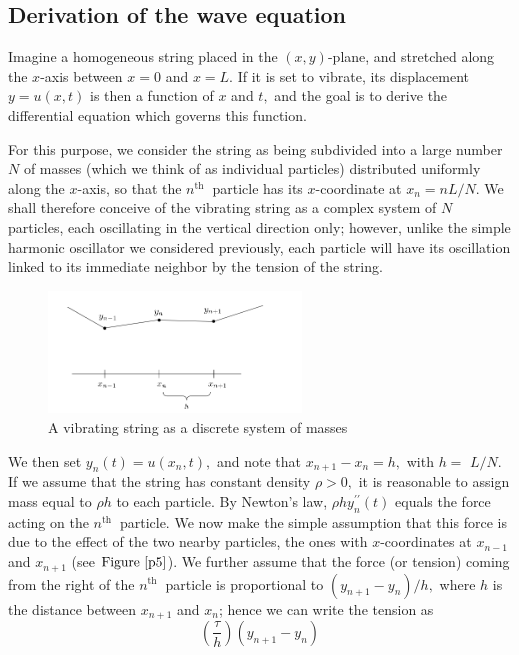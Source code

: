 \documentclass[12pt]{book}
\theoremstyle{definition}\newtheorem{dfn}{Définition}[chapter]
\theoremstyle{plain}\newtheorem{thm}{Théorème}[chapter]
\theoremstyle{plain}\newtheorem{prp}{Proposition}[chapter]
\theoremstyle{plain}\newtheorem{lem}{\bf Lemme}[chapter]
\theoremstyle{plain}\newtheorem{axm}{\bf Axiome}[chapter]
\theoremstyle{plain}\newtheorem{lmm}{\bf Lemme}[chapter]
\theoremstyle{plain}\newtheorem{exm}{\bf Example}[chapter]
\theoremstyle{plain}\newtheorem{cor}{\bf Corollaire}[chapter]
\theoremstyle{remark}\newtheorem{rem}{Remarque}[chapter]
\newcommand{\reffig}[1]{\text{Figure}\ \ref{#1}}
\begin{document}
\subsection{ Derivation of the wave equation}
Imagine a homogeneous string placed in the $(x, y)$-plane, and stretched along the $x$-axis between $x=0$ and $x=L .$ If it is set to vibrate, its displacement $y=u(x, t)$ is then a function of $x$ and $t,$ and the goal is to derive the differential equation which governs this function.

For this purpose, we consider the string as being subdivided into a large number $N$ of masses (which we think of as individual particles) distributed uniformly along the $x$-axis, so that the $n^{\text {th }}$ particle has its $x$-coordinate at $x_{n}=n L / N .$ We shall therefore conceive of the vibrating string as a complex system of $N$ particles, each oscillating in the vertical direction only; however, unlike the simple harmonic oscillator we considered previously, each particle will have its oscillation linked to its immediate neighbor by the tension of the string.
\begin{figure}[H]\centering\includegraphics[width=0.6\textwidth]{image//The Genesis of Fourier Analysis//5}
	\caption{A vibrating string as a discrete system of masses}
	\label{p5}	
\end{figure}
We then set $y_{n}(t)=u\left(x_{n}, t\right),$ and note that $x_{n+1}-x_{n}=h,$ with $h=$ $L / N .$ If we assume that the string has constant density $\rho>0,$ it is reasonable to assign mass equal to $\rho h$ to each particle. By Newton's law, $\rho h y_{n}^{\prime \prime}(t)$ equals the force acting on the $n^{\text {th }}$ particle. We now make the simple assumption that this force is due to the effect of the two nearby particles, the ones with $x$-coordinates at $x_{n-1}$ and $x_{n+1}$ (see $\reffig{p5}$). We further assume that the force (or tension) coming from the right of the $n^{\text {th }}$ particle is proportional to $\left(y_{n+1}-y_{n}\right) / h,$ where $h$ is the distance between $x_{n+1}$ and $x_{n}$; hence we can write the tension as
$$
\left(\frac{\tau}{h}\right)\left(y_{n+1}-y_{n}\right)
$$
\end{document}
